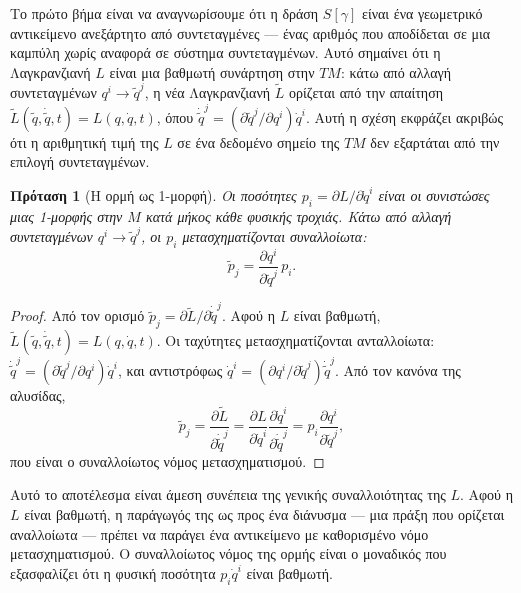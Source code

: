 \documentclass[11pt,a4paper,twoside,openright]{book}
\newtheorem{proposition}[lemma]{Πρόταση}
\begin{document}
Το πρώτο βήμα είναι να αναγνωρίσουμε ότι η δράση $S[\gamma]$ είναι ένα γεωμετρικό αντικείμενο ανεξάρτητο από συντεταγμένες — ένας αριθμός που αποδίδεται σε μια καμπύλη χωρίς αναφορά σε σύστημα συντεταγμένων. Αυτό σημαίνει ότι η Λαγκρανζιανή $L$ είναι μια βαθμωτή συνάρτηση στην $TM$: κάτω από αλλαγή συντεταγμένων $q^i \to \tilde{q}^j$, η νέα Λαγκρανζιανή $\tilde{L}$ ορίζεται από την απαίτηση $\tilde{L}(\tilde{q}, \dot{\tilde{q}}, t) = L(q, \dot{q}, t)$, όπου $\dot{\tilde{q}}^j = (\partial \tilde{q}^j / \partial q^i) \dot{q}^i$. Αυτή η σχέση εκφράζει ακριβώς ότι η αριθμητική τιμή της $L$ σε ένα δεδομένο σημείο της $TM$ δεν εξαρτάται από την επιλογή συντεταγμένων.

\begin{proposition}[Η ορμή ως 1-μορφή]
Οι ποσότητες $p_i = \partial L / \partial \dot{q}^i$ είναι οι συνιστώσες μιας 1-μορφής στην $M$ κατά μήκος κάθε φυσικής τροχιάς. Κάτω από αλλαγή συντεταγμένων $q^i \to \tilde{q}^j$, οι $p_i$ μετασχηματίζονται συναλλοίωτα:
\begin{equation}
\tilde{p}_j = \frac{\partial q^i}{\partial \tilde{q}^j} \, p_i. \tag{0.40}
\end{equation}
\end{proposition}

\begin{proof}
Από τον ορισμό $\tilde{p}_j = \partial \tilde{L} / \partial \dot{\tilde{q}}^j$. Αφού η $L$ είναι βαθμωτή, $\tilde{L}(\tilde{q}, \dot{\tilde{q}}, t) = L(q, \dot{q}, t)$. Οι ταχύτητες μετασχηματίζονται ανταλλοίωτα: $\dot{\tilde{q}}^j = (\partial \tilde{q}^j / \partial q^i) \dot{q}^i$, και αντιστρόφως $\dot{q}^i = (\partial q^i / \partial \tilde{q}^j) \dot{\tilde{q}}^j$. Από τον κανόνα της αλυσίδας,
\begin{equation}
\tilde{p}_j = \frac{\partial \tilde{L}}{\partial \dot{\tilde{q}}^j} = \frac{\partial L}{\partial \dot{q}^i} \frac{\partial \dot{q}^i}{\partial \dot{\tilde{q}}^j} = p_i \frac{\partial q^i}{\partial \tilde{q}^j},
\end{equation}
που είναι ο συναλλοίωτος νόμος μετασχηματισμού.
\end{proof}

Αυτό το αποτέλεσμα είναι άμεση συνέπεια της γενικής συναλλοιότητας της $L$. Αφού η $L$ είναι βαθμωτή, η παράγωγός της ως προς ένα διάνυσμα — μια πράξη που ορίζεται αναλλοίωτα — πρέπει να παράγει ένα αντικείμενο με καθορισμένο νόμο μετασχηματισμού. Ο συναλλοίωτος νόμος της ορμής είναι ο μοναδικός που εξασφαλίζει ότι η φυσική ποσότητα $p_i \dot{q}^i$ είναι βαθμωτή.
\end{document}
